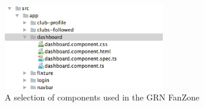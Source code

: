 \begin{figure}[H]
\begin{center}
\includegraphics[width=7cm]{figures/frontend_components}
\end{center}
\caption{A selection of components used in the GRN FanZone}
\label{fig:frontend_components}
\end{figure}
